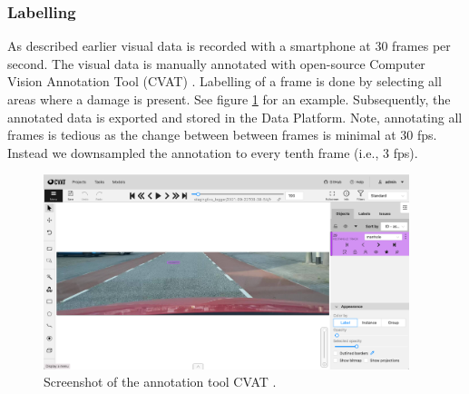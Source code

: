         
        
    



\subsubsection{Labelling}
\label{sec:visual-labelling}

As described earlier visual data is recorded with a smartphone at 30 frames per second. The visual data is manually annotated with open-source Computer Vision Annotation Tool (CVAT) \cite{cvat}.  Labelling of a frame is done by selecting all areas where a damage is present. See figure \ref{fig:cvat} for an example. Subsequently, the annotated data is exported and stored in the Data Platform. Note, annotating all frames is tedious as the change between between frames is minimal at 30 fps. Instead we downsampled the annotation to every tenth frame (i.e., 3 fps).


\begin{figure}[ht]
\centering
\includegraphics[width=0.95\textwidth,keepaspectratio]{images/4_data/cvat-screenshot.png}
\captionsetup{width=.90\textwidth}
\caption{Screenshot of the annotation tool CVAT \cite{cvat}.}
\label{fig:cvat}
\end{figure}


